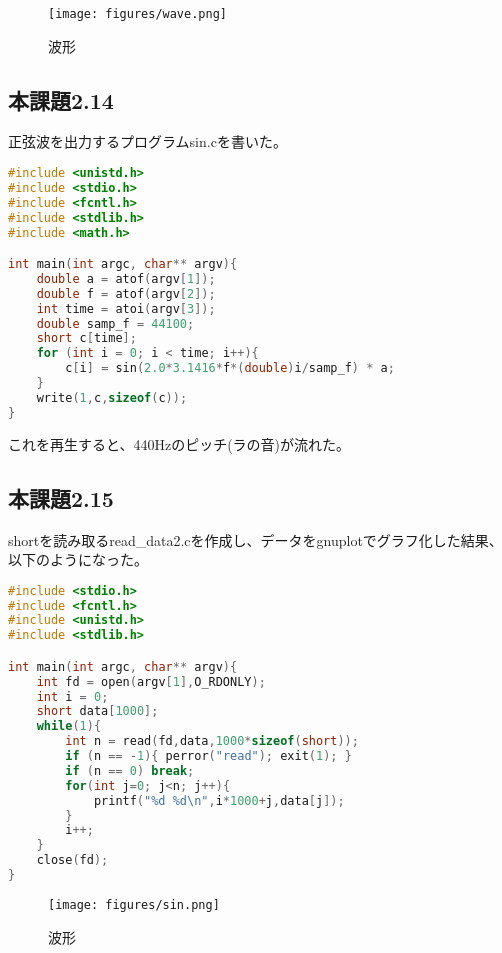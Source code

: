 \documentclass{ltjsarticle}
\begin{document}
\begin{figure}[H]
  \begin{center}
    \texttt{[image: figures/wave.png]}
    \caption{波形}
  \end{center}
\end{figure}

\subsection{本課題2.14}
正弦波を出力するプログラムsin.cを書いた。
\begin{lstlisting}[caption=sin.c,language=C]
#include <unistd.h>
#include <stdio.h>
#include <fcntl.h>
#include <stdlib.h>
#include <math.h>

int main(int argc, char** argv){
    double a = atof(argv[1]);
    double f = atof(argv[2]);
    int time = atoi(argv[3]);
    double samp_f = 44100;
    short c[time];
    for (int i = 0; i < time; i++){
        c[i] = sin(2.0*3.1416*f*(double)i/samp_f) * a;
    }
    write(1,c,sizeof(c));
}
\end{lstlisting}
これを再生すると、440Hzのピッチ(ラの音)が流れた。

\subsection{本課題2.15}
shortを読み取るread\_data2.cを作成し、データをgnuplotでグラフ化した結果、以下のようになった。
\begin{lstlisting}[caption=read\_data2.c,language=C]
#include <stdio.h>
#include <fcntl.h>
#include <unistd.h>
#include <stdlib.h>

int main(int argc, char** argv){
    int fd = open(argv[1],O_RDONLY);
    int i = 0;
    short data[1000];
    while(1){
        int n = read(fd,data,1000*sizeof(short));
        if (n == -1){ perror("read"); exit(1); }
        if (n == 0) break;
        for(int j=0; j<n; j++){
            printf("%d %d\n",i*1000+j,data[j]);
        }
        i++;
    }
    close(fd);
}
\end{lstlisting}
\begin{figure}[H]
  \begin{center}
    \texttt{[image: figures/sin.png]}
    \caption{波形}
  \end{center}
\end{figure}
\end{document}
